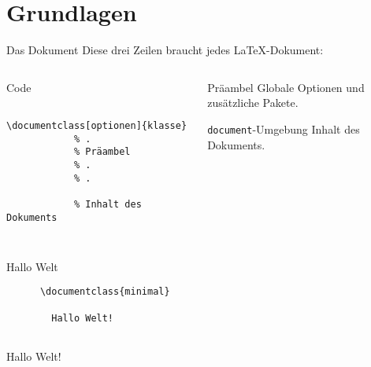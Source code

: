 \section{Grundlagen}

\begin{frame}[fragile]{Das Dokument}
  Diese drei Zeilen braucht jedes \LaTeX-Dokument:
  \begin{columns}[onlytextwidth, t]
    \begin{column}{0.50\textwidth}
      \begin{block}{Code}
        \begin{verbatim}
          \documentclass[optionen]{klasse}
            % .
            % Präambel
            % .
            % .
          
            % Inhalt des Dokuments
          
        \end{verbatim}
      \end{block}
    \end{column}
    \begin{column}{0.48\textwidth}
      \begin{block}{Präambel}
        Globale Optionen und zusätzliche Pakete.
      \end{block}
      \begin{block}{\texttt{document}-Umgebung}
        Inhalt des Dokuments.
      \end{block}
    \end{column}
  \end{columns}
\end{frame}
\begin{frame}[fragile]{Hallo Welt}
  \begin{CodeExample}{0.5}
    \begin{verbatim}
      \documentclass{minimal}
      
        Hallo Welt!
      
    \end{verbatim}
  \CodeResult
    \begin{minipage}[c][4\baselineskip][c]{\textwidth}
      \strut
      Hallo Welt!
    \end{minipage}
  \end{CodeExample}
\end{frame}

